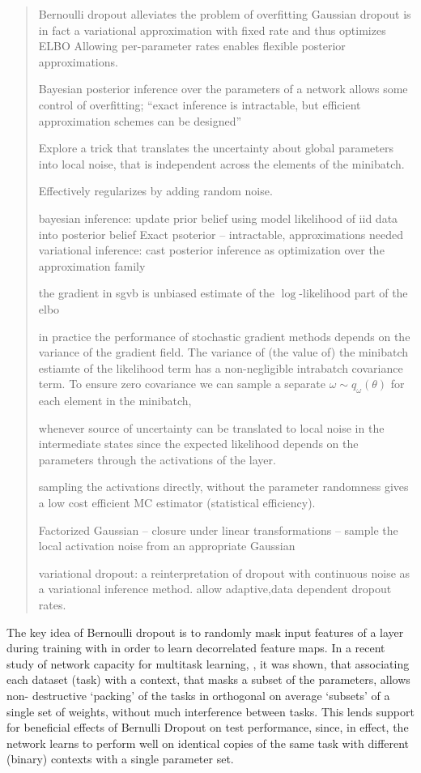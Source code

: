 \documentclass[a4paper,10pt]{article}
\begin{document}
\begin{quote}
Bernoulli dropout alleviates the problem of overfitting
Gaussian dropout is in fact a variational approximation with fixed rate and thus optimizes ELBO
Allowing per-parameter rates enables flexible posterior approximations.

Bayesian posterior inference over the parameters of a network allows some control of overfitting;
``exact inference is intractable, but efficient approximation schemes can be designed''

Explore a trick that translates the uncertainty about global parameters into local noise, that
is independent across the elements of the minibatch.

Effectively regularizes by adding random noise.

bayesian inference: update prior belief using model likelihood of iid data into posterior belief
Exact psoterior -- intractable, approximations needed
variational inference: cast posterior inference as optimization over the approximation family

the gradient in sgvb is unbiased estimate of the $\log$-likelihood part of the elbo

in practice the performance of stochastic gradient methods depends on the variance of the gradient
field. The variance of (the value of) the minibatch estiamte of the likelihood term has a
non-negligible intrabatch covariance term. To ensure zero covariance we can sample a separate
$\omega\sim q_\omega(\theta)$ for each element in the minibatch, 

whenever source of uncertainty can be translated to local noise in the intermediate states
since the expected likelihood depends on the parameters through the activations of the layer.

sampling the activations directly, without the parameter randomness gives a low cost efficient
MC estimator (statistical efficiency).

Factorized Gaussian -- closure under linear transformations -- sample the local activation noise
from an appropriate Gaussian 

variational dropout: a reinterpretation of dropout with continuous noise as a variational inference
method. allow adaptive,data dependent dropout rates.

\end{quote}


The key idea of Bernoulli dropout is to randomly mask input features of a layer during
training with in order to learn decorrelated feature maps. In a recent study of network
capacity for multitask learning, \cite{multitask2019}, it was shown, that associating
each dataset (task) with a context, that masks a subset of the parameters, allows non-%
destructive `packing' of the tasks in orthogonal on average `subsets' of a single set
of weights, without much interference between tasks. This lends support for beneficial
effects of Bernulli Dropout on test performance, since, in effect, the network learns
to perform well on identical copies of the same task with different (binary) contexts
with a single parameter set.
\end{document}
